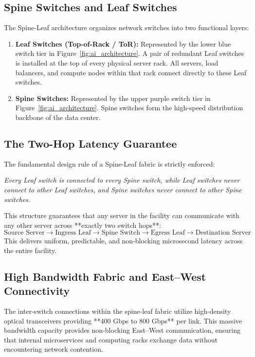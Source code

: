 \documentclass[12pt,a4paper]{report}
\begin{document}
\subsection{Spine Switches and Leaf Switches}
The Spine-Leaf architecture organizes network switches into two functional layers:
\begin{enumerate}[leftmargin=1.2cm]
    \item \textbf{Leaf Switches (Top-of-Rack / ToR):} Represented by the lower blue switch tier in Figure~\ref{fig:ai_architecture}. A pair of redundant Leaf switches is installed at the top of every physical server rack. All servers, load balancers, and compute nodes within that rack connect directly to these Leaf switches.
    \item \textbf{Spine Switches:} Represented by the upper purple switch tier in Figure~\ref{fig:ai_architecture}. Spine switches form the high-speed distribution backbone of the data center.
\end{enumerate}

\subsection{The Two-Hop Latency Guarantee}
The fundamental design rule of a Spine-Leaf fabric is strictly enforced:
\begin{center}
    \textit{Every Leaf switch is connected to every Spine switch, while Leaf switches never connect to other Leaf switches, and Spine switches never connect to other Spine switches.}
\end{center}

This structure guarantees that any server in the facility can communicate with any other server across **exactly two switch hops**:
\begin{equation}
    \text{Source Server} \longrightarrow \text{Ingress Leaf} \longrightarrow \text{Spine Switch} \longrightarrow \text{Egress Leaf} \longrightarrow \text{Destination Server}
\end{equation}
This delivers uniform, predictable, and non-blocking microsecond latency across the entire facility.

\subsection{High Bandwidth Fabric and East--West Connectivity}
The inter-switch connections within the spine-leaf fabric utilize high-density optical transceivers providing **400 Gbps to 800 Gbps** per link. This massive bandwidth capacity provides non-blocking East--West communication, ensuring that internal microservices and computing racks exchange data without encountering network contention.
\end{document}
